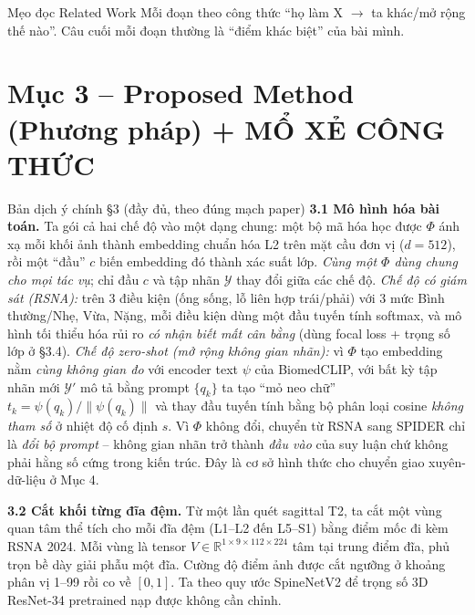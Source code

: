 \documentclass[12pt,a4paper]{article}
\begin{document}
\begin{keybox}{Mẹo đọc Related Work}
Mỗi đoạn theo công thức ``họ làm X $\to$ ta khác/mở rộng thế nào''. Câu cuối mỗi đoạn thường là ``điểm khác biệt'' của bài mình.
\end{keybox}

\section{Mục 3 -- Proposed Method (Phương pháp) + MỔ XẺ CÔNG THỨC}

\begin{dichbox}{Bản dịch ý chính §3 (đầy đủ, theo đúng mạch paper)}
\textbf{3.1 Mô hình hóa bài toán.} Ta gói cả hai chế độ vào một dạng chung: một bộ mã hóa học được $\Phi$ ánh xạ mỗi khối ảnh thành embedding chuẩn hóa L2 trên mặt cầu đơn vị ($d=512$), rồi một ``đầu'' $c$ biến embedding đó thành xác suất lớp. \emph{Cùng một $\Phi$ dùng chung cho mọi tác vụ}; chỉ đầu $c$ và tập nhãn $\mathcal{Y}$ thay đổi giữa các chế độ. \emph{Chế độ có giám sát (RSNA):} trên 3 điều kiện (ống sống, lỗ liên hợp trái/phải) với 3 mức {Bình thường/Nhẹ, Vừa, Nặng}, mỗi điều kiện dùng một đầu tuyến tính softmax, và mô hình tối thiểu hóa rủi ro \emph{có nhận biết mất cân bằng} (dùng focal loss + trọng số lớp ở §3.4). \emph{Chế độ zero-shot (mở rộng không gian nhãn):} vì $\Phi$ tạo embedding nằm \emph{cùng không gian đo} với encoder text $\psi$ của BiomedCLIP, với bất kỳ tập nhãn mới $\mathcal{Y}'$ mô tả bằng prompt $\{q_k\}$ ta tạo ``mỏ neo chữ'' $t_k=\psi(q_k)/\|\psi(q_k)\|$ và thay đầu tuyến tính bằng bộ phân loại cosine \emph{không tham số} ở nhiệt độ cố định $s$. Vì $\Phi$ không đổi, chuyển từ RSNA sang SPIDER chỉ là \emph{đổi bộ prompt} -- không gian nhãn trở thành \emph{đầu vào} của suy luận chứ không phải hằng số cứng trong kiến trúc. Đây là cơ sở hình thức cho chuyển giao xuyên-dữ-liệu ở Mục 4.

\textbf{3.2 Cắt khối từng đĩa đệm.} Từ một lần quét sagittal T2, ta cắt một vùng quan tâm thể tích cho mỗi đĩa đệm (L1--L2 đến L5--S1) bằng điểm mốc đi kèm RSNA 2024. Mỗi vùng là tensor $V\in\mathbb{R}^{1\times9\times112\times224}$ tâm tại trung điểm đĩa, phủ trọn bề dày giải phẫu một đĩa. Cường độ điểm ảnh được cắt ngưỡng ở khoảng phân vị 1--99 rồi co về $[0,1]$. Ta theo quy ước SpineNetV2 để trọng số 3D ResNet-34 pretrained nạp được không cần chỉnh.


\end{dichbox}
\end{document}
